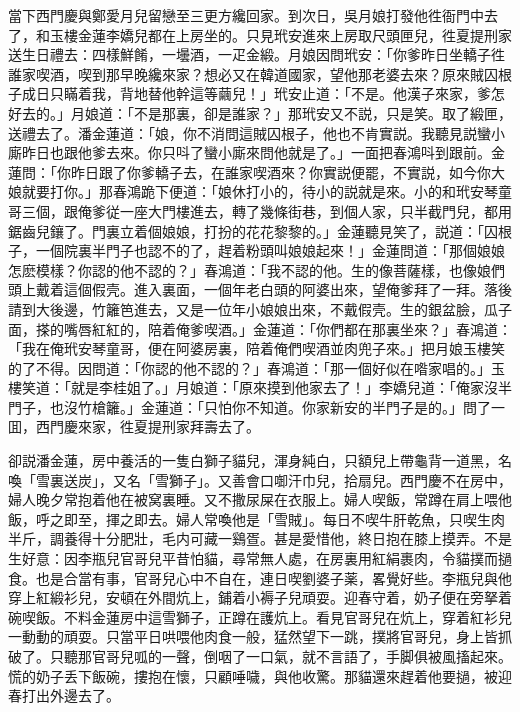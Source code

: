 當下西門慶與鄭愛月兒留戀至三更方纔回家。到次日，吳月娘打發他徃衙門中去了，和玉樓金蓮李嬌兒都在上房坐的。只見玳安進來上房取尺頭匣兒，徃夏提刑家送生日禮去：四樣鮮餚，一壜酒，一疋金緞。月娘因問玳安：「你爹昨日坐轎子徃誰家喫酒，喫到那早晚纔來家？想必又在韓道國家，望他那老婆去來？原來賊囚根子成日只瞞着我，背地替他幹這等繭兒！」玳安止道：「不是。他漢子來家，爹怎好去的。」月娘道：「不是那裏，卻是誰家？」那玳安又不説，只是笑。取了緞匣，送禮去了。潘金蓮道：「娘，你不消問這賊囚根子，他也不肯實説。我聽見説蠻小廝昨日也跟他爹去來。你只呌了蠻小廝來問他就是了。」一面把春鴻呌到跟前。金蓮問：「你昨日跟了你爹轎子去，在誰家喫酒來？你實説便罷，不實説，如今你大娘就要打你。」那春鴻跪下便道：「娘休打小的，待小的説就是來。小的和玳安琴童哥三個，跟俺爹従一座大門樓進去，轉了幾條街巷，到個人家，只半截門兒，都用鋸齒兒鑲了。門裏立着個娘娘，打扮的花花黎黎的。」金蓮聽見笑了，説道：「囚根子，一個院裏半門子也認不的了，趕着粉頭叫娘娘起來！」金蓮問道：「那個娘娘怎麽模樣？你認的他不認的？」春鴻道：「我不認的他。生的像菩薩樣，也像娘們頭上戴着這個假壳。進入裏面，一個年老白頭的阿婆出來，望俺爹拜了一拜。落後請到大後邊，竹籬笆進去，又是一位年小娘娘出來，不戴假壳。生的銀盆臉，瓜子面，搽的嘴唇紅紅的，陪着俺爹喫酒。」金蓮道：「你們都在那裏坐來？」春鴻道：「我在俺玳安琴童哥，便在阿婆房裏，陪着俺們喫酒並肉兜子來。」把月娘玉樓笑的了不得。因問道：「你認的他不認的？」春鴻道：「那一個好似在喒家唱的。」玉樓笑道：「就是李桂姐了。」月娘道：「原來摸到他家去了！」李嬌兒道：「俺家沒半門子，也沒竹槍籬。」金蓮道：「只怕你不知道。你家新安的半門子是的。」問了一囬，西門慶來家，徃夏提刑家拜壽去了。

卻説潘金蓮，房中養活的一隻白獅子貓兒，渾身純白，只額兒上帶龜背一道黑，名喚「雪裏送炭」，又名「雪獅子」。又善會口啣汗巾兒，拾扇兒。西門慶不在房中，婦人晚夕常抱着他在被窝裏睡。又不撒尿屎在衣服上。婦人喫飯，常蹲在肩上喂他飯，呼之即至，揮之即去。婦人常喚他是「雪賊」。每日不喫牛肝乾魚，只喫生肉半斤，調養得十分肥壯，毛内可藏一鷄疍。甚是愛惜他，終日抱在膝上摸弄。不是生好意：因李瓶兒官哥兒平昔怕貓，尋常無人處，在房裏用紅絹裹肉，令貓撲而撾食。也是合當有事，官哥兒心中不自在，連日喫劉婆子薬，畧覺好些。李瓶兒與他穿上紅緞衫兒，安頓在外間炕上，鋪着小褥子兒頑耍。迎春守着，奶子便在旁拏着碗喫飯。不料金蓮房中這雪獅子，正蹲在護炕上。看見官哥兒在炕上，穿着紅衫兒一動動的頑耍。只當平日哄喂他肉食一般，猛然望下一跳，撲將官哥兒，身上皆抓破了。只聽那官哥兒呱的一聲，倒咽了一口氣，就不言語了，手脚俱被風搐起來。慌的奶子丢下飯碗，摟抱在懷，只顧唾噦，與他收驚。那貓還來趕着他要撾，被迎春打出外邊去了。

